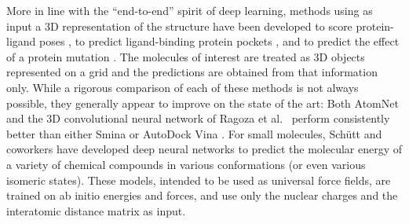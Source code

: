 More in line with the ``end-to-end'' spirit of deep learning, methods
using as input a 3D representation of the structure have been
developed to score protein-ligand poses \cite{wallach2015atomnet,
ragoza2017protein}, to predict ligand-binding protein
pockets \cite{jimenez2017deepsite}, and to predict the effect of a
protein mutation \cite{torng2017}. The molecules of interest are
treated as 3D objects represented on a grid and the predictions are
obtained from that information only. While a rigorous comparison of
each of these methods is not always possible, they generally appear to
improve on the state of the art: Both
AtomNet \cite{wallach2015atomnet} and the 3D convolutional neural
network of Ragoza et al.\ \cite{ragoza2017protein} perform
consistently better than either Smina \cite{koes2013smina} or AutoDock
Vina \cite{trott2009vina}.
%
For small molecules, Sch\"{u}tt and coworkers \cite{schutt2017quantum,
schutt2017moleculenet} have developed deep neural networks to predict
the molecular energy of a variety of chemical compounds in various
conformations (or even various isomeric states). These models,
intended to be used as universal force fields, are trained on ab
initio energies and forces, and use only the nuclear charges and the
interatomic distance matrix as input.
